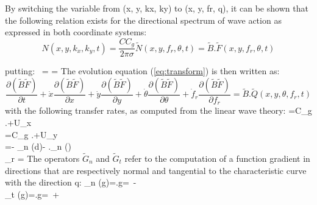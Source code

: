  By switching the variable from (x, y, kx, ky) to (x, y, fr, q), it can be shown that the following relation exists for the directional spectrum of wave action as expressed in both coordinate systems:
\begin{equation} \label{GrindEQ__4_9_}
N(x,y,k_{x} ,k_{y} ,t)=\frac{CC_{g} }{2\pi \sigma } \tilde{N}(x,y,f_{r} ,\theta ,t)=\tilde{B}.\tilde{F}(x,y,f_{r} ,\theta ,t)
\end{equation}

\bequ
\label{eq:GrindEQ__4_10}
\mbox{putting: } = =
\eequ
The evolution equation (\ref{eq:transform}) is then written as:
\begin{equation} \label{GrindEQ__4_11_}
\frac{\partial (\tilde{B}\tilde{F})}{\partial t} +\dot{x}\frac{\partial (\tilde{B}\tilde{F})}{\partial x} +\dot{y}\frac{\partial (\tilde{B}\tilde{F})}{\partial y} +\dot{\theta }\frac{\partial (\tilde{B}\tilde{F})}{\partial \theta } +\dot{f}_{r} \frac{\partial (\tilde{B}\tilde{F})}{\partial f_{r} } =\tilde{B}.\tilde{Q}(x,y,\theta ,f_{r} ,t)
\end{equation}
with the following transfer rates, as computed from the linear wave theory:
\bequ
\label{eq:equ4_12}
\dsp {}=C_{g} .\sin \theta +U_{x} \\[6pt]
\dsp {}=C_{g} .\cos \theta +U_{y}\\[6pt] 
\dsp \dot{\theta }=-  _{n} (d)- ._{n} ()\\[6pt]
\dsp {}_{r} = 
\earr
\eequ
 The operators $\tilde{G}_{n} $ and $\tilde{G}_{t} $ refer to the computation of a function gradient in directions that are respectively normal and tangential to the characteristic curve with the direction q:
\bequ
\label{eq:equ4_13}
\dsp {}_{n} (g)=.\vec{\nabla }g=\cos \theta \,  \; -\sin \theta \,  \\[6pt]
\dsp {}_{t} (g)=.\vec{\nabla }g=\sin \theta \,  \; +\cos \theta \, 
\earr
\eequ


